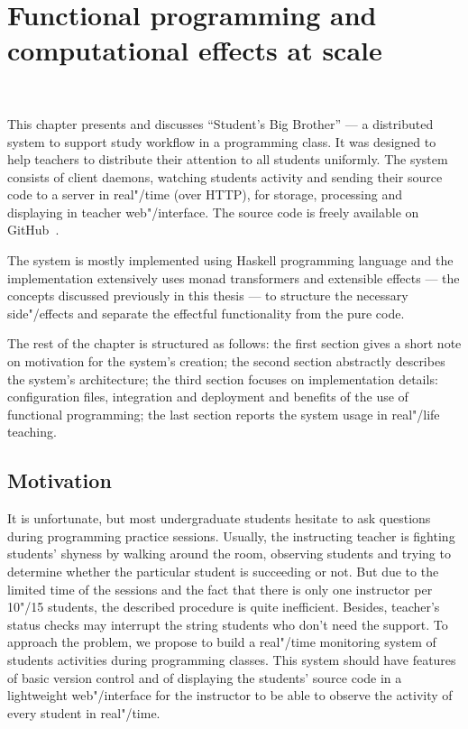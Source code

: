 \chapter{Functional programming and computational effects at scale}
~\label{cpt-effects}

This chapter presents and discusses ``Student's Big Brother'' --- a distributed
system to support study workflow in a programming class. It was designed to help
teachers to distribute their attention to all students uniformly. The system consists
of client daemons, watching students activity and sending their source code to a server
in real"/time (over HTTP), for storage, processing and displaying in teacher web"/interface.
The source code is freely available on GitHub~\cite{sbbRepo}.

The system is mostly implemented using Haskell programming language and the implementation
extensively uses monad transformers and extensible effects --- the concepts discussed previously
in this thesis --- to structure the necessary side"/effects and separate the effectful
functionality from the pure code.

The rest of the chapter is structured as follows: the first section gives a short
note on motivation for the system's creation; the second section abstractly describes
the system's architecture; the third section focuses on implementation details:
configuration files, integration and deployment and benefits of the use of functional
programming; the last section reports the system usage in real"/life teaching.

\section{Motivation}

It is unfortunate, but most undergraduate students hesitate to ask questions during
programming practice sessions. Usually, the instructing teacher is fighting
students' shyness by walking around the room, observing students and trying to
determine whether the particular student is succeeding or not. But due to the
limited time of the sessions and the fact that there is only one instructor per
10"/15 students, the described procedure is quite inefficient. Besides, teacher's
status checks may interrupt the string students who don't need the support. To approach the
problem, we propose to build a real"/time monitoring system of students activities during
programming classes. This system should have features of basic
version control and of displaying the students' source code in a lightweight
web"/interface for the instructor to be able to observe the activity of every
student in real"/time.

